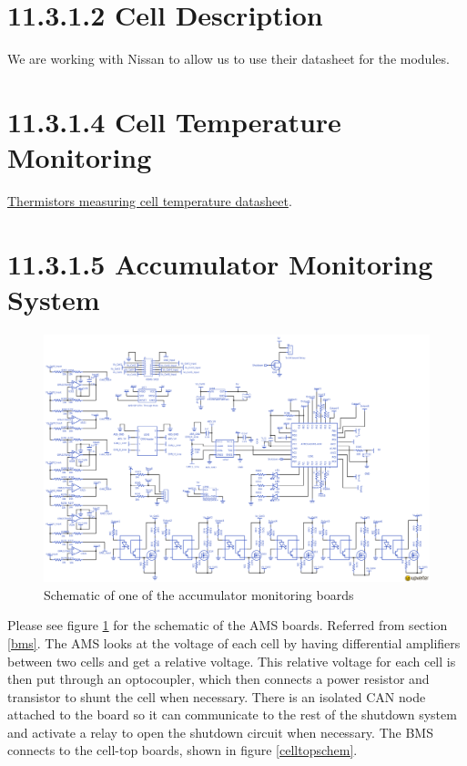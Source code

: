 \documentclass{article}
\begin{document}
\section*{11.3.1.2 Cell Description}
We are working with Nissan to allow us to use their datasheet for the modules.

\section*{11.3.1.4 Cell Temperature Monitoring}

\href{http://media.digikey.com/PDF/Data\%20Sheets/Ametherm\%20PDFs/PANR\%20103395-408.pdf}{Thermistors measuring cell temperature datasheet}.

\section*{11.3.1.5 Accumulator Monitoring System}  \label{amsappendix}

\begin{figure}
    \centering
    \includegraphics[width = 1 \textwidth]{BMS_Schem}
    \caption{Schematic of one of the accumulator monitoring boards}
    \label{amsschem}
\end{figure}

Please see figure \ref{amsschem} for the schematic of the AMS boards. Referred from section \ref{bms}. The AMS looks at the voltage of each cell by having differential amplifiers between two cells and get a relative voltage. This relative voltage for each cell is then put through an optocoupler, which then connects a power resistor and transistor to shunt the cell when necessary. There is an isolated CAN node attached to the board so it can communicate to the rest of the shutdown system and activate a relay to open the shutdown circuit when necessary. The BMS connects to the cell-top boards, shown in figure \ref{celltopschem}.
\end{document}
